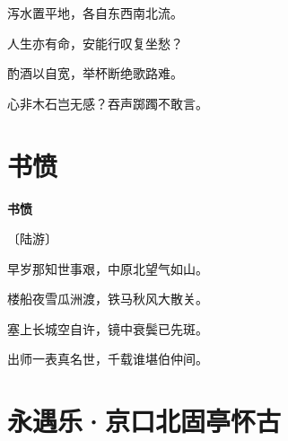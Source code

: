\documentclass[12pt,UTF-8,openany,fontset=none]{ctexbook}
\begin{document}
    \vspace{18pt}  %

\begin{center}
    \begin{Large}

        泻水置平地，各自东西南北流。

        人生亦有命，安能行叹复坐愁？

        酌酒以自宽，举杯断绝歌路难。

        心非木石岂无感？吞声踯躅不敢言。\hspace{24pt}

    \end{Large}

\end{center}

\vspace{8pt}
\clearpage

\section{书愤}


\begin{center}
    {\bfseries 书愤}

    \vspace{18pt}

    \begin{large}\xuwen
        〔陆游〕
    \end{large}

\end{center}

    \vspace{18pt}  %

\begin{center}
    \begin{Large}

        早岁那知世事艰，中原北望气如山。

        楼船夜雪瓜洲渡，铁马秋风大散关。

        塞上长城空自许，镜中衰鬓已先斑。

        出师一表真名世，千载谁堪伯仲间。

    \end{Large}

\end{center}

\vspace{8pt}
\clearpage

\section{永遇乐·京口北固亭怀古}
\end{document}
